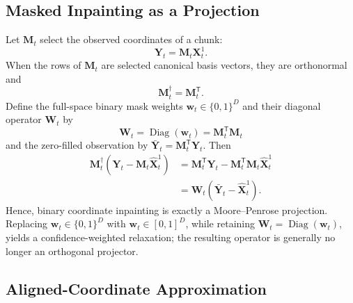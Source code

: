 \subsection{Masked Inpainting as a Projection}

Let $\mathbf M_t$ select the observed coordinates of a chunk:
\begin{equation}
    \mathbf Y_t=\mathbf M_t\mathbf X_t^1.
\end{equation}
When the rows of $\mathbf M_t$ are selected canonical basis vectors, they are
orthonormal and
\begin{equation}
    \mathbf M_t^\dagger=\mathbf M_t^{\mathsf T}.
\end{equation}
Define the full-space binary mask weights $\mathbf w_t\in\{0,1\}^D$ and their
diagonal operator $\mathbf W_t$ by
\begin{equation}
    \mathbf W_t
    =
    \operatorname{Diag}(\mathbf w_t)
    =
    \mathbf M_t^{\mathsf T}\mathbf M_t
\end{equation}
and the zero-filled observation by
$\bar{\mathbf Y}_t=\mathbf M_t^{\mathsf T}\mathbf Y_t$. Then
\begin{align}
    \mathbf M_t^\dagger
    \left(
        \mathbf Y_t-\mathbf M_t\hat{\mathbf X}_t^1
    \right)
    &=
    \mathbf M_t^{\mathsf T}\mathbf Y_t
    -
    \mathbf M_t^{\mathsf T}\mathbf M_t\hat{\mathbf X}_t^1\\
    &=
    \mathbf W_t
    \left(
        \bar{\mathbf Y}_t-\hat{\mathbf X}_t^1
    \right).
\end{align}
Hence, binary coordinate inpainting is exactly a Moore--Penrose projection.
Replacing $\mathbf w_t\in\{0,1\}^D$ with
$\mathbf w_t\in[0,1]^D$, while retaining
$\mathbf W_t=\operatorname{Diag}(\mathbf w_t)$, yields a confidence-weighted
relaxation; the resulting operator is generally no longer an orthogonal projector.

\subsection{Aligned-Coordinate Approximation}

